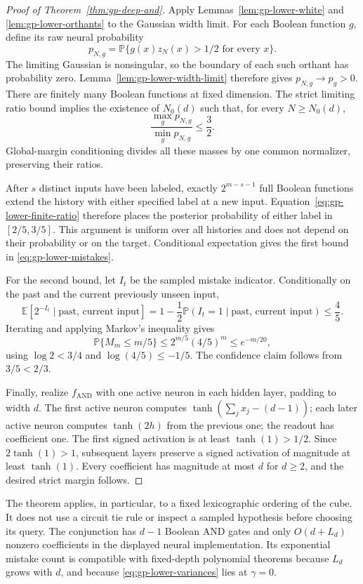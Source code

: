 \begin{proof}[Proof of Theorem~\ref{thm:gp-deep-and}]
Apply Lemmas~\ref{lem:gp-lower-white} and
\ref{lem:gp-lower-orthants} to the Gaussian width limit.
For each Boolean function $g$, define its raw neural probability
\[
 p_{N,g}=\mathbb P\{g(x)z_N(x)>1/2\text{ for every }x\}.
\]
The limiting Gaussian is nonsingular, so the boundary of each such
orthant has probability zero. Lemma~\ref{lem:gp-lower-width-limit}
therefore gives $p_{N,g}\to p_g>0$.
There are finitely many Boolean functions at fixed dimension.
The strict limiting ratio bound implies the existence of $N_0(d)$
such that, for every $N\ge N_0(d)$,
\begin{equation}\label{eq:gp-lower-finite-ratio}
 \frac{\max_g p_{N,g}}{\min_g p_{N,g}}\le\frac32.
\end{equation}
Global-margin conditioning divides all these masses by one common
normalizer, preserving their ratios.

After $s$ distinct inputs have been labeled, exactly
$2^{m-s-1}$ full Boolean functions extend the history with either
specified label at a new input. Equation~\eqref{eq:gp-lower-finite-ratio}
therefore places the posterior probability of either label in
$[2/5,3/5]$. This argument is uniform over all histories and does
not depend on their probability or on the target. Conditional
expectation gives the first bound in \eqref{eq:gp-lower-mistakes}.

For the second bound, let $I_t$ be the sampled mistake indicator.
Conditionally on the past and the current previously unseen input,
\[
 \mathbb E[2^{-I_t}\mid\text{past, current input}]
 =1-\frac12\mathbb P(I_t=1\mid\text{past, current input})
 \le\frac45.
\]
Iterating and applying Markov's inequality gives
\[
 \mathbb P\{M_m\le m/5\}
 \le 2^{m/5}(4/5)^m\le e^{-m/20},
\]
using $\log2<3/4$ and $\log(4/5)\le-1/5$.
The confidence claim follows from $3/5<2/3$.

Finally, realize $f_{\mathrm{AND}}$ with one active neuron in each
hidden layer, padding to width $d$. The first active neuron computes
$\tanh(\sum_jx_j-(d-1))$; each later active neuron computes
$\tanh(2h)$ from the previous one; the readout has coefficient one.
The first signed activation is at least $\tanh(1)>1/2$.
Since $2\tanh(1)>1$, subsequent layers preserve a signed activation
of magnitude at least $\tanh(1)$. Every coefficient has magnitude at
most $d$ for $d\ge2$, and the desired strict margin follows.
\end{proof}

The theorem applies, in particular, to a fixed lexicographic ordering
of the cube. It does not use a circuit tie rule or inspect a sampled
hypothesis before choosing its query. The conjunction has $d-1$
Boolean AND gates and only $O(d+L_d)$ nonzero coefficients in the
displayed neural implementation. Its exponential mistake count is
compatible with fixed-depth polynomial theorems because $L_d$ grows
with $d$, and because \eqref{eq:gp-lower-variances} lies at
$\gamma=0$.
